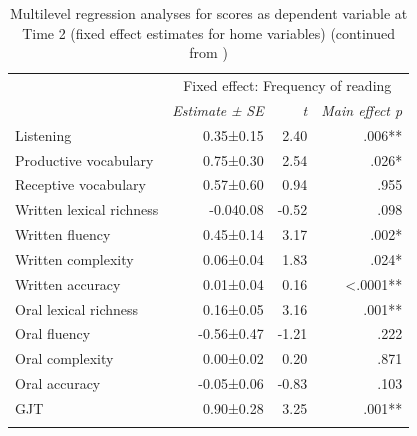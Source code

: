 \documentclass[output=paper,modfonts,nonflat,newtxmath]{langsci/langscibook}
\begin{document}
\begin{paperappendix}
\begin{table}
	\caption{\label{tab:pfenninger:18} Multilevel regression analyses for scores as dependent variable at Time 2 (fixed effect estimates for home variables) (continued from )}
	\begin{tabularx}{0.85\textwidth}{l rrr}
		\lsptoprule
		& \multicolumn{3}{c}{ Fixed effect: Frequency of reading}\\
		\cmidrule{2-4}
		& \textit{Estimate} \textit{±} \textit{SE} & \textit{t}  & \textit{Main effect p}\\
		\cmidrule{1-4}
		Listening & 0.35±0.15 & 2.40 & .006** \\
		Productive vocabulary & 0.75±0.30 & 2.54 & .026* \\
		Receptive vocabulary & 0.57±0.60 & 0.94 & .955  \\
		Written lexical richness & -0.040.08 & -0.52 & .098 \\
		Written fluency & 0.45±0.14 & 3.17 & .002* \\
		Written complexity & 0.06±0.04 & 1.83 & .024* \\
		Written accuracy & 0.01±0.04 & 0.16 & <.0001** \\
		Oral lexical richness & 0.16±0.05 & 3.16 & .001**\\
		Oral fluency & -0.56±0.47 & -1.21 & .222  \\
		Oral complexity & 0.00±0.02 & 0.20 & .871 \\
		Oral accuracy & {}-0.05±0.06 & -0.83 & .103\\
		GJT & 0.90±0.28 & 3.25 & .001** \\
			\lspbottomrule
	\end{tabularx}
\end{table}


\end{paperappendix}
\end{document}
